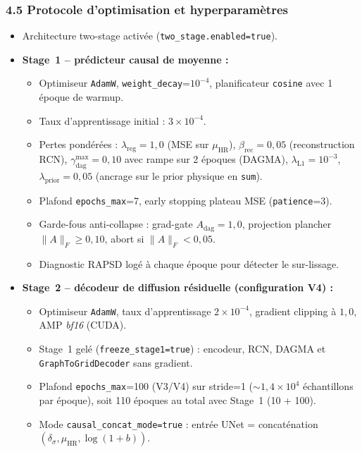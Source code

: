 \documentclass[12pt,a4paper]{article}
\begin{document}
\subsubsection*{4.5 Protocole d'optimisation et hyperparam\`etres}
\begin{itemize}
    \item Architecture two-stage activ\'ee (\texttt{two\_stage.enabled=true}).
    \item \textbf{Stage~1 -- pr\'edicteur causal de moyenne :}
    \begin{itemize}
        \item Optimiseur \texttt{AdamW}, \texttt{weight\_decay}=$10^{-4}$, planificateur \texttt{cosine} avec 1 \'epoque de warmup.
        \item Taux d'apprentissage initial : $3 \times 10^{-4}$.
        \item Pertes pond\'er\'ees : $\lambda_{\text{reg}}=1{,}0$ (MSE sur $\mu_{\mathrm{HR}}$), $\beta_{\text{rec}}=0{,}05$ (reconstruction RCN), $\gamma_{\text{dag}}^{\max}=0{,}10$ avec rampe sur 2 \'epoques (DAGMA), $\lambda_{\text{L1}}=10^{-3}$, $\lambda_{\text{prior}}=0{,}05$ (ancrage sur le prior physique en \texttt{sum}).
        \item Plafond \texttt{epochs\_max}=7, early stopping plateau MSE (\texttt{patience}=3).
        \item Garde-fous anti-collapse : grad-gate $A_{\text{dag}}=1{,}0$, projection plancher $\|A\|_F \geq 0{,}10$, abort si $\|A\|_F < 0{,}05$.
        \item Diagnostic RAPSD log\'e \`a chaque \'epoque pour d\'etecter le sur-lissage.
    \end{itemize}
    \item \textbf{Stage~2 -- d\'ecodeur de diffusion r\'esiduelle (configuration V4) :}
    \begin{itemize}
        \item Optimiseur \texttt{AdamW}, taux d'apprentissage $2 \times 10^{-4}$, gradient clipping \`a $1{,}0$, AMP \emph{bf16} (CUDA).
        \item Stage~1 gel\'e (\texttt{freeze\_stage1=true}) : encodeur, RCN, DAGMA et \texttt{GraphToGridDecoder} sans gradient.
        \item Plafond \texttt{epochs\_max}=100 (V3/V4) sur stride=1 ($\sim 1{,}4\times 10^{4}$ \'echantillons par \'epoque), soit 110 \'epoques au total avec Stage~1 (10 + 100).
        \item Mode \texttt{causal\_concat\_mode=true} : entr\'ee UNet = concat\'enation $(\delta_\sigma, \mu_{\mathrm{HR}}, \log(1+b))$.

\end{itemize}
\end{itemize}
\end{document}
